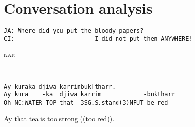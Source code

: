 \chapter{Conversation analysis}
 
\newcommand{\transheader}[2]{\ea\label{#1}#2\z\vspace*{-.7\baselineskip}}

\newlength{\transindent}
\setlength{\transindent}{2mm}

\newenvironment{transbox}[3][\footnotesize]{%
  \setstretch{0.7}
  \medskip\noindent
  \hspace*{\transindent}%
  #1
  \parbox[b]{3mm}{#1  \oldstylenums{#2}\vphantom{fj}}%
  \parbox[b]{8mm}{#1\scshape  \MakeLowercase{#3} \vphantom{fj}}%
  \begin{minipage}[t]{11cm}#1\vspace*{-1.9\baselineskip}{}\,\vphantom{fj}}
  {\end{minipage}}

\newcommand{\emptytransbox}[3][\footnotesize]{%
  \medskip\noindent
  \hspace*{\transindent}%
  \parbox{3mm}{#1 \oldstylenums{#2}}%
  \parbox{8mm}{~}%
  #1 #3\\
}

\newcommand{\xtransbox}[4][\footnotesize]{%
  \medskip\noindent
  \hspace*{\transindent}%
  \parbox{3mm}{#1 \oldstylenums{#2}}%
  \parbox{8mm}{\scshape #1 #3}%
  #1 #4
}


\ea
\begin{lstlisting}
JA: Where did you put the bloody papers? 
CI:                       I did not put them ANYWHERE!
\end{lstlisting}
\z

\ea 
\begin{transbox}{1}{Kar}
\begin{verbatim}
Ay kuraka djiwa karrimbuk[tharr.
Ay kura    -ka  djiwa karrim            -buktharr
Oh NC:WATER-TOP that  3SG.S.stand(3)NFUT-be_red
\end{verbatim}\vspace*{-3mm}
Ay that tea is too strong ((too red)).
\end{transbox}


